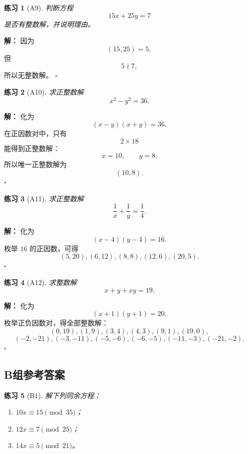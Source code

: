 \documentclass[11pt,a4paper,fontset=fandol]{ctexart}
\theoremstyle{formaltheorem}
\theoremstyle{formalexample}
\newtheorem{exercise}{练习}[section]
\newenvironment{solution}{\par\noindent\textbf{解：}}{\hfill$\square$\par}
\begin{document}
\begin{exercise}[A9]
判断方程
\[
15x+25y=7
\]
是否有整数解，并说明理由。
\end{exercise}

\begin{solution}
因为
\[
(15,25)=5,
\]
但
\[
5\nmid 7,
\]
所以无整数解。
\end{solution}

\begin{exercise}[A10]
求正整数解
\[
x^2-y^2=36.
\]
\end{exercise}

\begin{solution}
化为
\[
(x-y)(x+y)=36.
\]
在正因数对中，只有
\[
2\times 18
\]
能得到正整数解：
\[
x=10,\qquad y=8.
\]
所以唯一正整数解为
\[
\boxed{(10,8)}.
\]
\end{solution}

\begin{exercise}[A11]
求正整数解
\[
\frac1x+\frac1y=\frac14.
\]
\end{exercise}

\begin{solution}
化为
\[
(x-4)(y-4)=16.
\]
枚举 $16$ 的正因数，可得
\[
\boxed{(5,20),(6,12),(8,8),(12,6),(20,5)}.
\]
\end{solution}

\begin{exercise}[A12]
求整数解
\[
x+y+xy=19.
\]
\end{exercise}

\begin{solution}
化为
\[
(x+1)(y+1)=20.
\]
枚举正负因数对，得全部整数解：
\[
\boxed{(0,19),(1,9),(3,4),(4,3),(9,1),(19,0),}
\]
\[
\boxed{(-2,-21),(-3,-11),(-5,-6),(-6,-5),(-11,-3),(-21,-2).}
\]
\end{solution}

\subsection{B组参考答案}

\begin{exercise}[B1]
解下列同余方程：
\begin{enumerate}
  \item $10x\equiv 15\pmod{35}$；
  \item $12x\equiv 7\pmod{25}$；
  \item $14x\equiv 5\pmod{21}$。
\end{enumerate}
\end{exercise}
\end{document}

